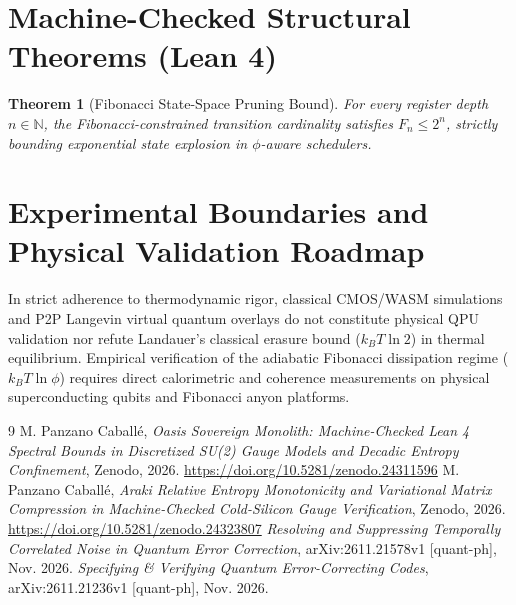 \documentclass[11pt,a4paper]{article}
\newtheorem{theorem}{Theorem}
\begin{document}
\section{Machine-Checked Structural Theorems (Lean 4)}
\begin{theorem}[Fibonacci State-Space Pruning Bound]
For every register depth $n \in \mathbb{N}$, the Fibonacci-constrained transition cardinality satisfies $F_n \le 2^n$, strictly bounding exponential state explosion in $\phi$-aware schedulers.
\end{theorem}

\section{Experimental Boundaries and Physical Validation Roadmap}
In strict adherence to thermodynamic rigor, classical CMOS/WASM simulations and P2P Langevin virtual quantum overlays do not constitute physical QPU validation nor refute Landauer's classical erasure bound ($k_B T \ln 2$) in thermal equilibrium. Empirical verification of the adiabatic Fibonacci dissipation regime ($k_B T \ln \phi$) requires direct calorimetric and coherence measurements on physical superconducting qubits and Fibonacci anyon platforms.

\begin{thebibliography}{9}
 M. Panzano Caball\'e, \emph{Oasis Sovereign Monolith: Machine-Checked Lean 4 Spectral Bounds in Discretized SU(2) Gauge Models and Decadic Entropy Confinement}, Zenodo, 2026. \url{https://doi.org/10.5281/zenodo.24311596}
 M. Panzano Caball\'e, \emph{Araki Relative Entropy Monotonicity and Variational Matrix Compression in Machine-Checked Cold-Silicon Gauge Verification}, Zenodo, 2026. \url{https://doi.org/10.5281/zenodo.24323807}
 \emph{Resolving and Suppressing Temporally Correlated Noise in Quantum Error Correction}, arXiv:2611.21578v1 [quant-ph], Nov. 2026.
 \emph{Specifying \& Verifying Quantum Error-Correcting Codes}, arXiv:2611.21236v1 [quant-ph], Nov. 2026.
\end{thebibliography}
\end{document}
